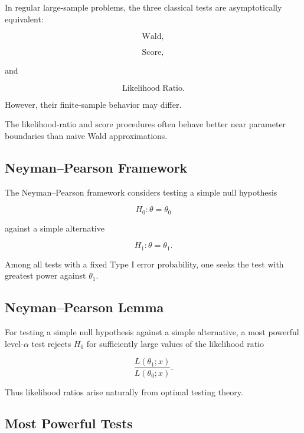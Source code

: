 In regular large-sample problems, the three classical tests are
asymptotically equivalent:

\[
\boxed{
\text{Wald},
}
\]

\[
\boxed{
\text{Score},
}
\]

and

\[
\boxed{
\text{Likelihood Ratio}.
}
\]

However, their finite-sample behavior may differ.

The likelihood-ratio and score procedures often behave better near
parameter boundaries than naive Wald approximations.

\subsection{Neyman--Pearson Framework}
\label{subsec:neyman-pearson}

The Neyman--Pearson framework considers testing a simple null hypothesis

\[
H_0:\theta=\theta_0
\]

against a simple alternative

\[
H_1:\theta=\theta_1.
\]

Among all tests with a fixed Type I error probability, one seeks the test
with greatest power against \(\theta_1\).

\subsection{Neyman--Pearson Lemma}
\label{subsec:neyman-pearson-lemma}

\begin{theorem}
For testing a simple null hypothesis against a simple alternative, a
most powerful level-\(\alpha\) test rejects \(H_0\) for sufficiently
large values of the likelihood ratio

\[
\boxed{
\frac{
L(\theta_1;x)
}{
L(\theta_0;x)
}.
}
\]
\end{theorem}

Thus likelihood ratios arise naturally from optimal testing theory.

\subsection{Most Powerful Tests}
\label{subsec:most-powerful-tests}

